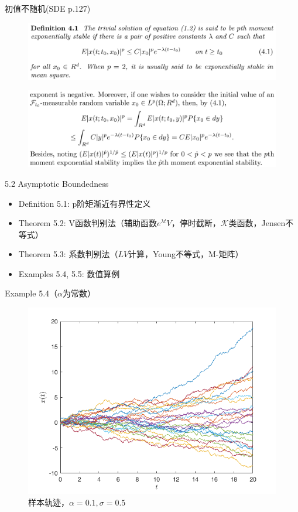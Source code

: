 \documentclass[10pt,aspectratio=43]{beamer}
\begin{document}
\begin{frame}{初值不随机(SDE p.127)}
\begin{figure}
\centering
\includegraphics[width=\linewidth]{../figures/x5}
\end{figure}
\begin{figure}
\centering
\includegraphics[width=\linewidth]{../figures/x6}
\end{figure}
\end{frame}

\begin{frame}{5.2 Asymptotic Boundedness}
\begin{itemize}
\item Definition 5.1: p阶矩渐近有界性定义
\item Theorem 5.2: V函数判别法（辅助函数$ e^{\lambda t}V $，停时截断，$ \mathcal{K} $类函数，Jensen不等式）
\item Theorem 5.3: 系数判别法（$ LV $计算，Young不等式，M-矩阵）
\item Examples 5.4, 5.5: 数值算例
\end{itemize}
\end{frame}

\begin{frame}{Example 5.4（$ \alpha $为常数）}
\begin{figure}
\centering
\includegraphics[width=0.7\linewidth]{../figures/1}
\caption{样本轨迹，$ \alpha=0.1,\sigma=0.5 $}
\end{figure}
\end{frame}
\end{document}
